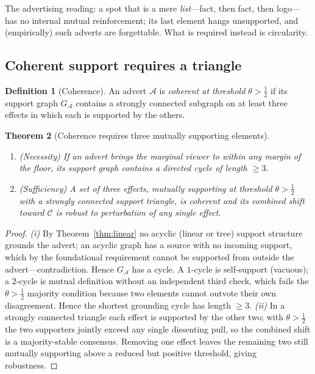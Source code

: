 \documentclass[twocolumn,11pt,a4paper]{article}
\theoremstyle{adv}
\newtheorem{theorem}{Theorem}[section]
\theoremstyle{definition}
\newtheorem{definition}[theorem]{Definition}
\theoremstyle{remark}
\newcommand{\Cell}{\mathcal{C}}        %
\newcommand{\Adv}{\mathcal{A}}        %
\newcommand{\half}{\tfrac{1}{2}}
\begin{document}
The advertising reading: a spot that is a mere \emph{list}---fact, then
fact, then logo---has no internal mutual reinforcement; its last element
hangs unsupported, and (empirically) such adverts are forgettable. What is
required instead is circularity.

\subsection{Coherent support requires a triangle}

\begin{definition}[Coherence]
\label{def:coherence}
An advert $\Adv$ is \emph{coherent at threshold $\theta>\half$} if its
support graph $G_\Adv$ contains a strongly connected subgraph on at least
three effects in which each is supported by the others.
\end{definition}

\begin{theorem}[Coherence requires three mutually supporting elements]
\label{thm:triangle}
\leavevmode
\begin{enumerate}[label=(\roman*),leftmargin=1.8em,itemsep=2pt]
\item \emph{(Necessity)} If an advert brings the marginal viewer to within
  any margin of the floor, its support graph contains a directed cycle of
  length $\ge3$.
\item \emph{(Sufficiency)} A set of three effects, mutually supporting at
  threshold $\theta>\half$ with a strongly connected support triangle, is
  coherent and its combined shift toward $\Cell$ is robust to perturbation
  of any single effect.
\end{enumerate}
\end{theorem}

\begin{proof}
\emph{(i)} By Theorem~\ref{thm:linear} no acyclic (linear or tree) support
structure grounds the advert; an acyclic graph has a source with no
incoming support, which by the foundational requirement cannot be
supported from outside the advert---contradiction. Hence $G_\Adv$ has a
cycle. A $1$-cycle is self-support (vacuous); a $2$-cycle is mutual
definition without an independent third check, which fails the
$\theta>\half$ majority condition because two elements cannot
outvote their own disagreement. Hence the shortest grounding cycle has
length $\ge3$. \emph{(ii)} In a strongly connected triangle each effect is
supported by the other two; with $\theta>\half$ the two supporters
jointly exceed any single dissenting pull, so the combined shift is a
majority-stable consensus. Removing one effect leaves the remaining two
still mutually supporting above a reduced but positive threshold, giving
robustness.
\end{proof}
\end{document}
